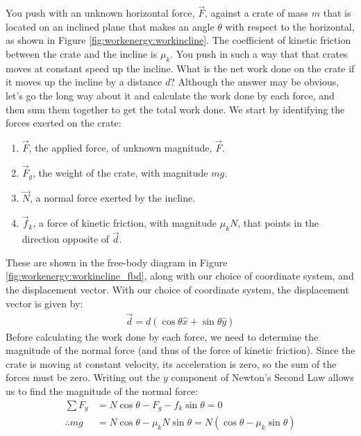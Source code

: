 \begin{example}{
You push with an unknown horizontal force, $\vec F$, against a crate of mass $m$ that is located on an inclined plane that makes an angle $\theta$ with respect to the horizontal, as shown in Figure \ref{fig:workenergy:workincline}. The coefficient of kinetic friction between the crate and the incline is $\mu_k$. You push in such a way that that crates moves at constant speed up the incline. What is the net work done on the crate if it moves up the incline by a distance $d$?}
Although the answer may be obvious, let's go the long way about it and calculate the work done by each force, and then sum them together to get the total work done. We start by identifying the forces exerted on the crate:
\begin{enumerate}
\item $\vec F$, the applied force, of unknown magnitude, $\vec F$.
\item $\vec F_g$, the weight of the crate, with magnitude $mg$. 
\item $\vec N$, a normal force exerted by the incline.
\item $\vec f_k$, a force of kinetic friction, with magnitude $\mu_k N$, that points in the direction opposite of $\vec d$. 
\end{enumerate}
These are shown in the free-body diagram in Figure \ref{fig:workenergy:workincline_fbd}, along with our choice of coordinate system, and the displacement vector. 
With our choice of coordinate system, the displacement vector is given by:
\begin{align*}
\vec d = d (\cos\theta \hat x + \sin\theta \hat y)
\end{align*}
Before calculating the work done by each force, we need to determine the magnitude of the normal force (and thus of the force of kinetic friction). Since the crate is moving at constant velocity, its acceleration is zero, so the sum of the forces must be zero. Writing out the $y$ component of Newton's Second Law allows us to find the magnitude of the normal force:
\begin{align*}
\sum F_y &= N\cos\theta -F_g - f_k\sin\theta = 0\\
\therefore mg &= N\cos\theta-\mu_kN\sin\theta = N(\cos\theta-\mu_k\sin\theta)\\

\end{align*}
\end{example}
